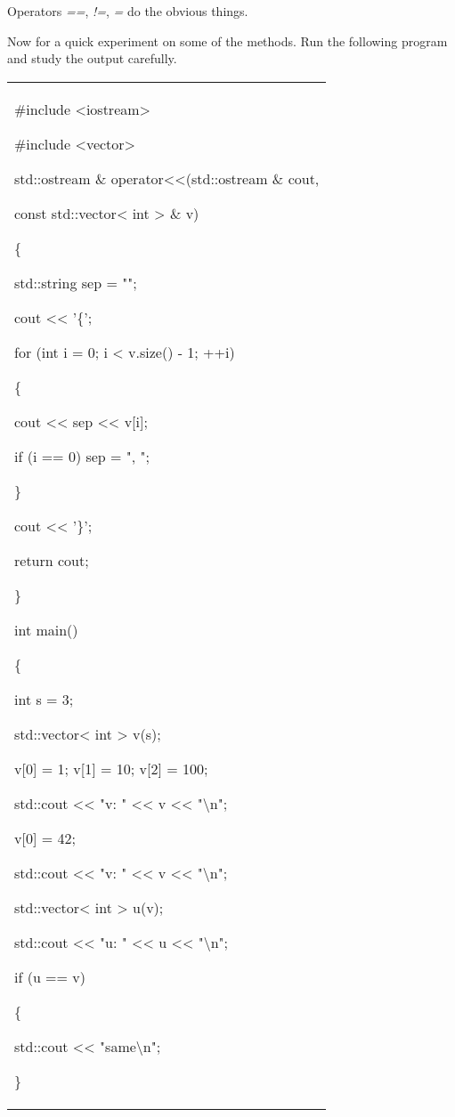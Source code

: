 \documentclass[
]{article}
\begin{document}
Operators \emph{==}, \emph{!=}, \emph{=} do the obvious things.

Now for a quick experiment on some of the methods. Run the following
program and study the output carefully.

\begin{longtable}[]{@{}l@{}}
\toprule
\endhead
\begin{minipage}[t]{0.97\columnwidth}\raggedright
\#include \textless iostream\textgreater{}

\#include \textless vector\textgreater{}

std::ostream \& operator\textless\textless(std::ostream \& cout,

const std::vector\textless{} int \textgreater{} \& v)

\{

std::string sep = "";

cout \textless\textless{} '\{';

for (int i = 0; i \textless{} v.size() - 1; ++i)

\{

cout \textless\textless{} sep \textless\textless{} v{[}i{]};

if (i == 0) sep = ", ";

\}

cout \textless\textless{} '\}';

return cout;

\}

int main()

\{

int s = 3;

std::vector\textless{} int \textgreater{} v(s);

v{[}0{]} = 1; v{[}1{]} = 10; v{[}2{]} = 100;

std::cout \textless\textless{} "v: " \textless\textless{} v
\textless\textless{} "\textbackslash n";

v{[}0{]} = 42;

std::cout \textless\textless{} "v: " \textless\textless{} v
\textless\textless{} "\textbackslash n";

std::vector\textless{} int \textgreater{} u(v);

std::cout \textless\textless{} "u: " \textless\textless{} u
\textless\textless{} "\textbackslash n";

if (u == v)

\{

std::cout \textless\textless{} "same\textbackslash n";

\}


\end{minipage}
\end{longtable}
\end{document}
